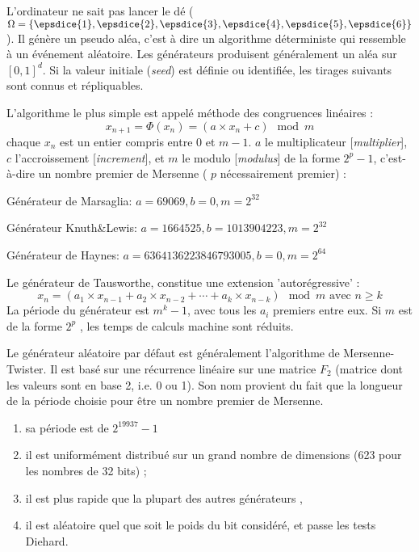 \begin{f}
L'ordinateur ne sait pas lancer le dé (\(\Omega=\{ \epsdice{1}, \epsdice{2}, \epsdice{3}, \epsdice{4}, \epsdice{5}, \epsdice{6} \}\)).
Il génère un pseudo aléa, c'est à dire un algorithme déterministe qui ressemble à un événement aléatoire.
Les générateurs produisent généralement un aléa sur \([0,1]^d\).
Si la valeur initiale (\emph{seed}) est définie ou identifiée, les tirages suivants sont connus et répliquables.


L'algorithme le plus simple est  appelé méthode des congruences linéaires :
\[
x_{n+1}=\Phi(x_n)= (a\times x_n+c) \mod m
\] \small
chaque \(x_n\) est un entier compris entre 0 et \(m-1\).
\(a\) le multiplicateur [\emph{multiplier}], \(c\) l'accroissement [\emph{increment}], et \(m\) le modulo [\emph{modulus}] de la forme \(2^p-1\), c'est-à-dire un nombre premier de Mersenne ( \( p \) nécessairement premier) :

Générateur de Marsaglia: \(a=69069, b=0, m=2^{32}\)

Générateur Knuth\&Lewis: \(a=1664525, b=1013904223, m=2^{32}\)

Générateur de Haynes: \(a=6364136223846793005, b=0, m=2^{64}\)

Le générateur de Tausworthe, constitue une extension 'autorégressive' :
\[
x_{n}=(a_{1}\times x_{n-1}+a_{2}\times x_{n-2}+\cdots +a_{k}\times x_{n-k}) \mod m \text{ avec } n\geq k
\]
La période du générateur est \(m^k-1\), avec tous les \(a_i\) premiers entre eux. Si \(m\) est de la forme \(2^p\) , les temps de calculs machine sont réduits. 


Le générateur aléatoire par défaut est généralement l'algorithme de Mersenne-Twister. Il est basé sur une récurrence linéaire sur une matrice \(F_{2}\) (matrice dont les valeurs sont en base 2, i.e. 0 ou 1). 
Son nom provient du fait que la longueur de la période choisie pour être un nombre premier de Mersenne. 
\begin{enumerate}
	\item     sa période est de \(2^{19937}-1 \)
	\item     il est uniformément distribué sur un grand nombre de dimensions (623 pour les nombres de 32 bits) ;
	\item     il est plus rapide que la plupart des autres générateurs ,
	\item     il est aléatoire quel que soit le poids du bit considéré, et passe les tests Diehard.
\end{enumerate}
\end{f}
%

